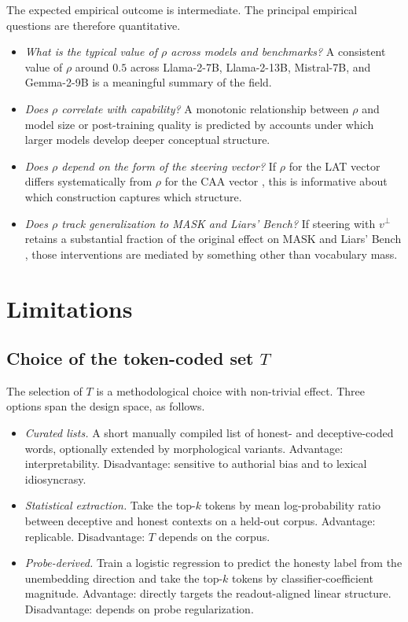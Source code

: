 \documentclass[11pt,letterpaper]{article}
\theoremstyle{plain}
\theoremstyle{definition}
\newcommand{\1}{\mathbf{1}}
\newcommand{\vperp}{v^{\perp}}
\begin{document}
The expected empirical outcome is intermediate. The principal empirical questions are therefore quantitative.

\begin{itemize}[leftmargin=*]
\item \emph{What is the typical value of $\rho$ across models and benchmarks?} A consistent value of $\rho$ around $0.5$ across Llama-2-7B, Llama-2-13B, Mistral-7B, and Gemma-2-9B is a meaningful summary of the field.
\item \emph{Does $\rho$ correlate with capability?} A monotonic relationship between $\rho$ and model size or post-training quality is predicted by accounts under which larger models develop deeper conceptual structure.
\item \emph{Does $\rho$ depend on the form of the steering vector?} If $\rho$ for the LAT vector \cite{zou2023repe} differs systematically from $\rho$ for the CAA vector \cite{rimsky2024caa}, this is informative about which construction captures which structure.
\item \emph{Does $\rho$ track generalization to MASK and Liars' Bench?} If steering with $\vperp$ retains a substantial fraction of the original effect on MASK \cite{ren2025mask} and Liars' Bench \cite{kretschmar2025liarsbench}, those interventions are mediated by something other than vocabulary mass.
\end{itemize}

\section{Limitations}\label{sec:limitations}

\subsection{Choice of the token-coded set $T$}

The selection of $T$ is a methodological choice with non-trivial effect. Three options span the design space, as follows.
\begin{itemize}[leftmargin=*]
\item \emph{Curated lists.} A short manually compiled list of honest- and deceptive-coded words, optionally extended by morphological variants. Advantage: interpretability. Disadvantage: sensitive to authorial bias and to lexical idiosyncrasy.
\item \emph{Statistical extraction.} Take the top-$k$ tokens by mean log-probability ratio between deceptive and honest contexts on a held-out corpus. Advantage: replicable. Disadvantage: $T$ depends on the corpus.
\item \emph{Probe-derived.} Train a logistic regression to predict the honesty label from the unembedding direction and take the top-$k$ tokens by classifier-coefficient magnitude. Advantage: directly targets the readout-aligned linear structure. Disadvantage: depends on probe regularization.
\end{itemize}
\end{document}
